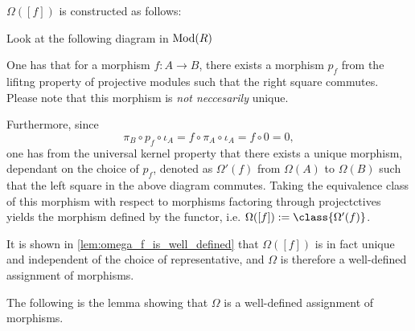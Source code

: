 \begin{remark}
    \label{rem:stmod_omega_f}
    \( \Omega([f]) \) is constructed as follows:

    Look at the following diagram in \( \operatorname{Mod}(R) \)
    \begin{center}
    \end{center}

    One has that for a morphism \( f: A \to B \), there exists a morphism \( p_f \) from the lifitng property of projective modules such that the right square commutes. Please note that this morphism is \emph{not neccesarily} unique.

    Furthermore, since
    \[
        \pi_B \circ p_f \circ \iota_A = f \circ \pi_A \circ \iota_A = f \circ 0 = 0,
    \]
    one has from the universal kernel property that there exists a unique morphism, dependant on the choice of \( p_f \), denoted as \( \Omega'(f) \) from \( \Omega(A) \) to \( \Omega(B) \) such that the left square in the above diagram commutes. Taking the equivalence class of this morphism with respect to morphisms factoring through projectctives yields the morphism defined by the functor, i.e. \( \Omega([f]) := \class{\Omega'(f)} \).

    It is shown in \autoref{lem:omega_f_is_well_defined} that \( \Omega([f]) \) is in fact unique and independent of the choice of representative, and \( \Omega \) is therefore a well-defined assignment of morphisms.
\end{remark}

The following is the lemma showing that \( \Omega \) is a well-defined assignment of morphisms.

